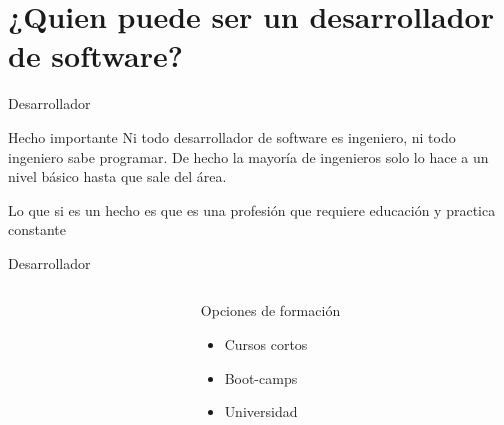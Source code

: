 \documentclass[aspectratio=169]{beamer}
\begin{document}
\section{¿Quien puede ser un desarrollador de software?}



\begin{frame}{Desarrollador}
    \begin{alertblock}{Hecho importante}
    Ni todo desarrollador de software es ingeniero, ni todo ingeniero sabe programar. De hecho la mayoría de ingenieros solo lo hace a un nivel básico hasta que sale del área.
    \end{alertblock}
    Lo que si es un hecho es que es una profesión que requiere educación y practica constante
\end{frame}

\begin{frame}[fragile,c]{Desarrollador}

\begin{columns}[T] %
	     \begin{column}[T]{7cm} %

	     \end{column}
	     \begin{column}[T]{4cm} %
             Opciones de formación
			\begin{itemize}
    			\item Cursos cortos
                \item Boot-camps
                \item Universidad

			\end{itemize}

	     \end{column}
     \end{columns}

\end{frame}
\end{document}
